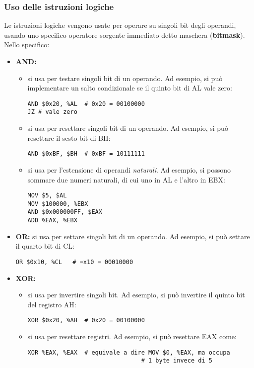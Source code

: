 \documentclass[a4paper,11pt]{article}
\begin{document}
\subsubsection{Uso delle istruzioni logiche}
Le istruzioni logiche vengono usate per operare su singoli bit degli operandi, usando uno specifico operatore sorgente immediato detto maschera (\textbf{bitmask}).
Nello specifico:
\begin{itemize}
	\item \textbf{AND:} 
		\begin{itemize}
			\item si usa per testare singoli bit di un operando.
			Ad esempio, si può implementare un salto condizionale se il quinto bit di AL vale zero:
			\begin{lstlisting}[language=assembler,style=codestyle]	
AND $0x20, %AL	# 0x20 = 00100000
JZ # vale zero
\end{lstlisting} 
			\item si usa per resettare singoli bit di un operando.
			Ad esempio, si può resettare il sesto bit di BH:
			\begin{lstlisting}[language=assembler,style=codestyle]	
AND $0xBF, $BH	# 0xBF = 10111111
\end{lstlisting}
			\item si usa per l'estensione di operandi \textit{naturali}.
				Ad esempio, si possono sommare due numeri naturali, di cui uno in AL e l'altro in EBX:
				\begin{lstlisting}[language=assembler,style=codestyle]	
MOV $5, $AL
MOV $100000, %EBX
AND $0x000000FF, $EAX
ADD %EAX, %EBX	
\end{lstlisting}
		\end{itemize} 
	\item \textbf{OR:} si usa per settare singoli bit di un operando.
		Ad esempio, si può settare il quarto bit di CL:
		\begin{lstlisting}[language=assembler,style=codestyle]	
OR $0x10, %CL	# =x10 = 00010000
\end{lstlisting}
	\item \textbf{XOR:}
		\begin{itemize}
			\item si usa per invertire singoli bit.
		Ad esempio, si può invertire il quinto bit del registro AH:
		\begin{lstlisting}[language=assembler,style=codestyle]	
XOR $0x20, %AH	# 0x20 = 00100000
\end{lstlisting}
	\item si usa per resettare registri.
		Ad esempio, si può resettare EAX come:
		\begin{lstlisting}[language=assembler,style=codestyle]	
XOR %EAX, %EAX	# equivale a dire MOV $0, %EAX, ma occupa 
								# 1 byte invece di 5
\end{lstlisting}
		\end{itemize}
\end{itemize}
\end{document}
